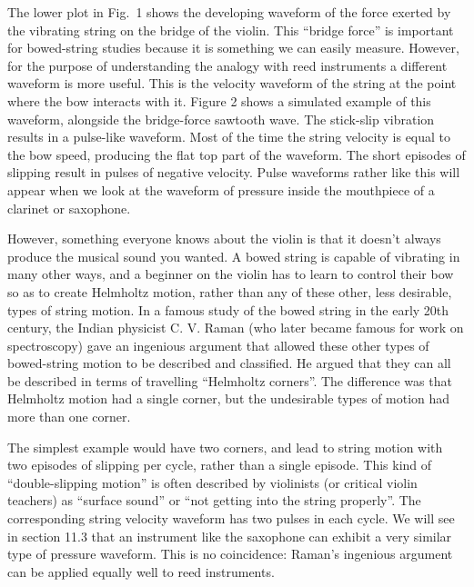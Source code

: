   The lower plot in Fig.\ 1 shows the developing waveform of the force exerted 
  by the vibrating string on the bridge of the violin. This “bridge force” is 
  important for bowed-string studies because it is something we can easily 
  measure. However, for the purpose of understanding the analogy with reed 
  instruments a different waveform is more useful. This is the velocity 
  waveform of the string at the point where the bow interacts with it. Figure 2 
  shows a simulated example of this waveform, alongside the bridge-force 
  sawtooth wave. The stick-slip vibration results in a pulse-like waveform. 
  Most of the time the string velocity is equal to the bow speed, producing the 
  flat top part of the waveform. The short episodes of slipping result in 
  pulses of negative velocity. Pulse waveforms rather like this will appear 
  when we look at the waveform of pressure inside the mouthpiece of a clarinet 
  or saxophone. 


  However, something everyone knows about the violin is that it doesn’t always 
  produce the musical sound you wanted. A bowed string is capable of vibrating 
  in many other ways, and a beginner on the violin has to learn to control 
  their bow so as to create Helmholtz motion, rather than any of these other, 
  less desirable, types of string motion. In a famous study of the bowed string 
  in the early 20th century, the Indian physicist C. V. Raman (who later became 
  famous for work on spectroscopy) gave an ingenious argument that allowed 
  these other types of bowed-string motion to be described and classified. He 
  argued that they can all be described in terms of travelling “Helmholtz 
  corners”. The difference was that Helmholtz motion had a single corner, but 
  the undesirable types of motion had more than one corner. 

  The simplest example would have two corners, and lead to string motion with 
  two episodes of slipping per cycle, rather than a single episode. This kind 
  of “double-slipping motion” is often described by violinists (or critical 
  violin teachers) as “surface sound” or “not getting into the string 
  properly”. The corresponding string velocity waveform has two pulses in each 
  cycle. We will see in section 11.3 that an instrument like the saxophone can 
  exhibit a very similar type of pressure waveform. This is no coincidence: 
  Raman’s ingenious argument can be applied equally well to reed instruments. 

